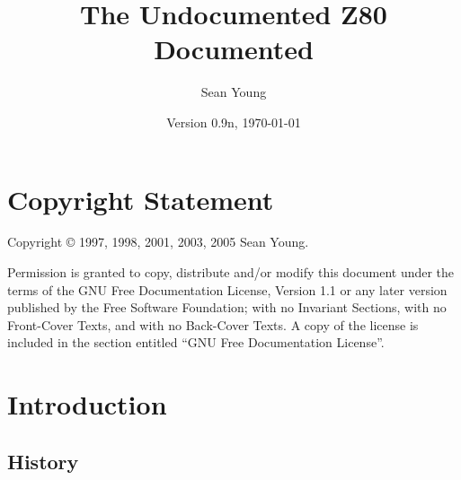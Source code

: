 \documentclass[oneside,a4paper]{book}
\begin{document}

\title{The Undocumented Z80 Documented}
\author{Sean Young}
\date{Version 0.9n, \today}

\maketitle

\frontmatter




\chapter*{Copyright Statement}

Copyright {\copyright} 1997, 1998, 2001, 2003, 2005 Sean Young.

Permission is granted to copy, distribute and/or modify this document under the terms of the GNU Free Documentation License, Version 1.1 or any later version published by the Free Software Foundation; with no Invariant Sections, with no Front-Cover Texts, and with no Back-Cover Texts. A copy of the license is included in the section entitled ``GNU Free Documentation License''.

\setcounter{tocdepth}{1}
\tableofcontents

\mainmatter




\setcounter{page}{5}
\chapter{Introduction}

\section{History}
\end{document}
